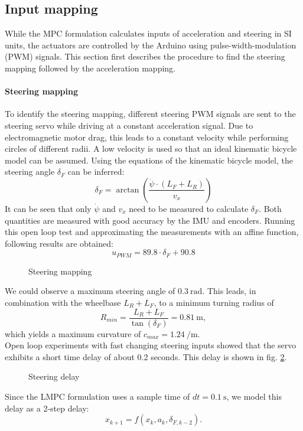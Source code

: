 \subsection{Input mapping}\label{sec:inputMapping}
While the MPC formulation calculates inputs of acceleration and steering in SI units, the actuators are controlled by the Arduino using pulse-width-modulation (PWM) signals. This section first describes the procedure to find the steering mapping followed by the acceleration mapping.
\paragraph{Steering mapping} To identify the steering mapping, different steering PWM signals are sent to the steering servo while driving at a constant acceleration signal. Due to electromagnetic motor drag, this leads to a constant velocity while performing circles of different radii. A low velocity is used so that an ideal kinematic bicycle model can be assumed. Using the equations of the kinematic bicycle model, the steering angle $\delta_F$ can be inferred:
\begin{equation}\label{eq:deltaF}
\delta_F = \arctan\left(\frac{\dot\psi\cdot(L_F+L_R)}{v_x}\right)
\end{equation}
It can be seen that only $\dot \psi$ and $v_x$ need to be measured to calculate $\delta_F$. Both quantities are measured with good accuracy by the IMU and encoders.
Running this open loop test and approximating the measurements with an affine function, following results are obtained:
\begin{equation}
u_{PWM} = 89.8\cdot \delta_F + 90.8
\end{equation}
\begin{figure}[ht]
    \centering
  
    \caption{Steering mapping}
    \label{fig:d_f_mapping}
\end{figure}
We could observe a maximum steering angle of $\SI{0.3}{\radian}$. This leads, in combination with the wheelbase $L_R+L_F$, to a minimum turning radius of
\begin{equation}
R_{min} = \frac{L_R+L_F}{\tan(\delta_F)} = \SI{0.81}{\meter},
\end{equation}
which yields a maximum curvature of $c_{max}=\SI{1.24}{\per\meter}$.\\
Open loop experiments with fast changing steering inputs showed that the servo exhibits a short time delay of about 0.2 seconds. This delay is shown in fig. \ref{fig:d_f_delay}.
\begin{figure}[ht]
    \centering
      
    \caption{Steering delay}
    \label{fig:d_f_delay}
\end{figure}
Since the LMPC formulation uses a sample time of $dt=\SI{0.1}{\second}$, we model this delay as a 2-step delay:
\begin{equation}
x_{k+1}=f(x_k,a_k,\delta_{F,k-2}).
\end{equation}

